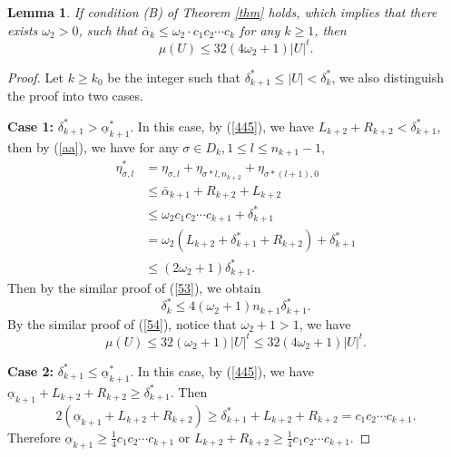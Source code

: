 \documentclass[reqno]{amsart}
\theoremstyle{plain}
\newtheorem{lem}{Lemma}
\theoremstyle{definition}
\theoremstyle{remark}
\numberwithin{equation}{section} \DeclareMathOperator\intr{int}
\begin{document}
\begin{lem}\label{l4}
If condition \rm{(B)} of Theorem \rm{\ref{thm}} holds,
which implies that there exists $\omega_2>0$, such that $\bar{\alpha}_{k}\le \omega_2\cdot c_1c_2\cdots c_{k}$ for any $k\ge 1$,  then
\begin{equation*}
\mu(U)\le 32(4\omega_2+1)\left | U \right |^t.
\end{equation*}
\end{lem}

\begin{proof}
Let $k\ge k_0$ be the integer such that $\delta^*_{k+1}\le \left | U \right | <\delta^*_k$, we also distinguish the proof into two cases.

\textbf{Case 1:}  $\delta^*_{k+1}> \underline\alpha^*_{k+1}$. In this case,  by (\ref{445}), we have  $L_{k+2}+R_{k+2}<\delta^*_{k+1}$, then by (\ref{aa}), we have for any $\sigma \in D_k,  1\le l \le n_{k+1}-1$,
\begin{equation}
\begin{aligned}
\eta^*_{\sigma,l} & = \eta_{\sigma,l}+\eta_{\sigma*l,n_{k+2}}+\eta_{\sigma*(l+1),0}\\
&\le \bar{\alpha}_{k+1}+R_{k+2}+L_{k+2}   \\
&\le \omega_2c_1c_2\cdots c_{k+1}+\delta^*_{k+1} \\
&= \omega_2(L_{k+2}+\delta^*_{k+1}+R_{k+2}) +\delta^*_{k+1}\\
&\le (2\omega_2+1)\delta^*_{k+1}.\nonumber
\end{aligned}
\end{equation}
Then by the similar proof of (\ref{53}), we obtain
\begin{equation}
\delta^*_k\le 4(\omega_2+1)n_{k+1}\delta^*_{k+1}.\nonumber
\end{equation}
By the similar proof of (\ref{54}), notice that $\omega_2+1> 1$, we have $$\mu(U)\le 32(\omega_2+1)\left | U \right |^t\le 32(4\omega_2+1)\left | U \right |^t.$$

\textbf{Case 2:}  $\delta^*_{k+1}\le \underline\alpha^*_{k+1}$. In this case, by (\ref{445}), we have $\underline{\alpha}_{k+1}+L_{k+2}+R_{k+2}\ge \delta^*_{k+1}$. Then
\begin{equation}
2(\underline{\alpha}_{k+1}+L_{k+2}+R_{k+2})\ge \delta^*_{k+1}+L_{k+2}+R_{k+2}=c_1c_2\cdots c_{k+1}.\nonumber
\end{equation}
Therefore
$\underline{\alpha}_{k+1}\ge \frac{1}{4}c_1c_2\cdots c_{k+1}$ or $L_{k+2}+R_{k+2}\ge \frac{1}{4}c_1c_2\cdots c_{k+1}$.


\end{proof}
\end{document}
